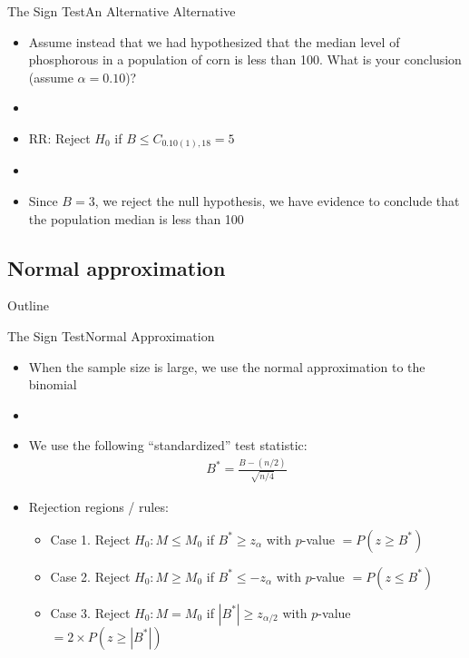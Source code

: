 \documentclass[xcolor=dvipsnames]{beamer}
\begin{document}
\begin{frame}{The Sign Test}{An Alternative Alternative}
\begin{itemize}
	\item Assume instead that we had hypothesized that the median level of phosphorous in a population of corn is less than 100. What is your conclusion (assume $\alpha = 0.10$)? \pause
	\item[]
	\item RR: Reject $H_0$ if $B \leq C_{0.10(1), 18} = 5 $ \pause
	\item[]
	\item Since $B = 3$, we reject the null hypothesis, we have evidence to conclude that the population median is less than 100
\end{itemize}
\end{frame}

\subsection{Normal approximation}
\begin{frame}{Outline}
\tableofcontents[currentsection,subsectionstyle=show/shaded/hide]
\end{frame}

\begin{frame}{The Sign Test}{Normal Approximation}
	\begin{itemize}
		\item When the sample size is large, we use the normal approximation to the binomial \pause
		\item[]
		\item We use the following ``standardized'' test statistic: \pause
		\begin{gather*}
		B^* = \frac{B-(n/2)}{\sqrt{n/4}}
		\end{gather*}
		
		\item Rejection regions / rules: 
		\begin{itemize}
			\item Case 1. Reject $H_0: M \leq M_0$ if $B^* \geq z_{\alpha}$ with $p$-value $=P(z \geq B^*)$ \pause
			\item Case 2. Reject $H_0: M \geq M_0$ if $B^* \leq -z_{\alpha}$ with $p$-value $=P(z \leq B^*)$
			\pause
			\item Case 3. Reject $H_0: M = M_0$ if $|B^*| \geq z_{\alpha/2}$ with $p$-value $=2\times P(z \geq |B^*|)$
		\end{itemize}
	\end{itemize}
\end{frame}
\end{document}
